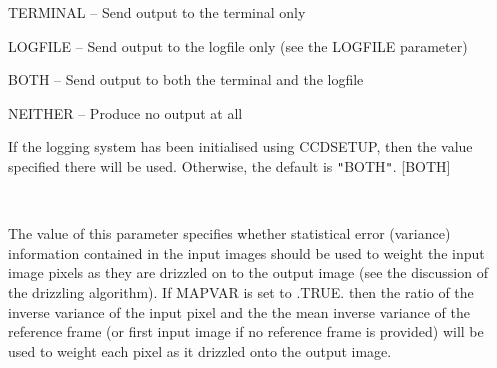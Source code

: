 \documentclass[twoside,11pt]{article}
\renewcommand{\_}{\texttt{\symbol{95}}}
\newcommand{\sstsubsection}[1]{ \item[{#1}] \mbox{} \\}
\newcommand{\sstitem}{\item}
\newcommand{\sstsubsection}[1]{\item[{#1}]}
\newcommand{\sstitem}{\item}
\begin{document}
{{{{            \sstitem
               TERMINAL  -- Send output to the terminal only

            \sstitem
               LOGFILE   -- Send output to the logfile only (see the
                               LOGFILE parameter)

            \sstitem
               BOTH      -- Send output to both the terminal and the
                               logfile

            \sstitem
               NEITHER   -- Produce no output at all

         }
         If the logging system has been initialised using CCDSETUP,
         then the value specified there will be used. Otherwise, the
         default is {\tt "}BOTH{\tt "}.
         [BOTH]
      }
      \sstsubsection{
         MAPVAR = \_LOGICAL (Read)
      }{
         The value of this parameter specifies whether statistical
         error (variance) information contained in the input images
         should be used to weight the input image pixels as they
         are drizzled on to the output image (see the discussion of the
         drizzling algorithm). If MAPVAR is set to .TRUE. then the
         ratio of the inverse variance of the input pixel and the
         the mean inverse variance of the reference frame (or first
         input image if no reference frame is provided) will be used to
         weight each pixel as it drizzled onto the output image.

}}}
\end{document}
